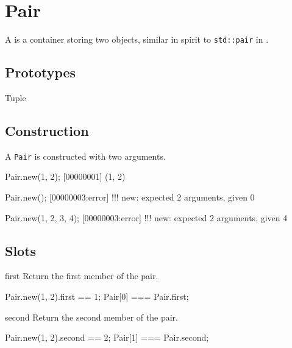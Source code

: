 
\section{Pair}

A  is a container storing two objects, similar in spirit to
\lstinline|std::pair| in \Cxx.

\subsection{Prototypes}
\begin{refObjects}
\item[Tuple]
\end{refObjects}

\subsection{Construction}

A \lstinline|Pair| is constructed with two arguments.

\begin{urbiscript}[firstnumber=1]
Pair.new(1, 2);
[00000001] (1, 2)

Pair.new();
[00000003:error] !!! new: expected 2 arguments, given 0

Pair.new(1, 2, 3, 4);
[00000003:error] !!! new: expected 2 arguments, given 4
\end{urbiscript}

\subsection{Slots}
\begin{urbiscriptapi}
\item[first]
  Return the first member of the pair.
\begin{urbiassert}
Pair.new(1, 2).first == 1;
Pair[0] === Pair.first;
\end{urbiassert}


\item[second]
  Return the second member of the pair.
\begin{urbiassert}
Pair.new(1, 2).second == 2;
Pair[1] === Pair.second;
\end{urbiassert}
\end{urbiscriptapi}



